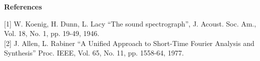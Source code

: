 {\bf \large {}\selectfont References}\\
\hspace*{1.5cm}
\begin{minipage}[t]{13.5cm}
[1] W. Koenig, H. Dunn, L. Lacy ``The sound spectrograph'',
J. Acoust. Soc. Am., Vol. 18, No. 1, pp. 19-49, 1946.\\

[2] J. Allen, L. Rabiner ``A Unified Approach to Short-Time Fourier
Analysis and Synthesis'' Proc. IEEE, Vol. 65, No. 11, pp. 1558-64, 1977. 
\end{minipage}
